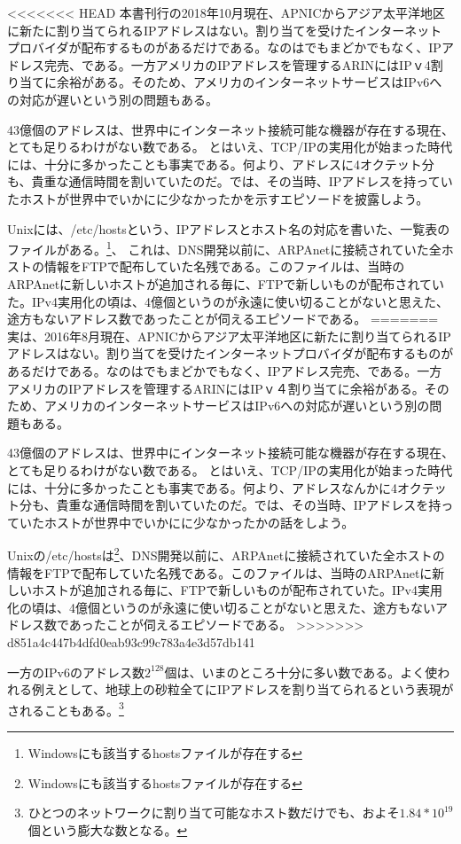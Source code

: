 \begin{itemize}
<<<<<<< HEAD
本書刊行の2018年10月現在、APNICからアジア太平洋地区に新たに割り当てられるIPアドレスはない。割り当てを受けたインターネットプロバイダが配布するものがあるだけである。なのはでもまどかでもなく、IPアドレス完売、である。一方アメリカのIPアドレスを管理するARINにはIPｖ4割り当てに余裕がある。そのため、アメリカのインターネットサービスはIPv6への対応が遅いという別の問題もある。

43億個のアドレスは、世界中にインターネット接続可能な機器が存在する現在、とても足りるわけがない数である。
とはいえ、TCP/IPの実用化が始まった時代には、十分に多かったことも事実である。何より、アドレスに4オクテット分も、貴重な通信時間を割いていたのだ。では、その当時、IPアドレスを持っていたホストが世界中でいかにに少なかったかを示すエピソードを披露しよう。

Unixには、/etc/hostsという、IPアドレスとホスト名の対応を書いた、一覧表のファイルがある。\footnote{Windowsにも該当するhostsファイルが存在する}、
これは、DNS開発以前に、ARPAnetに接続されていた全ホストの情報をFTPで配布していた名残である。このファイルは、当時のARPAnetに新しいホストが追加される毎に、FTPで新しいものが配布されていた。IPv4実用化の頃は、4億個というのが永遠に使い切ることがないと思えた、途方もないアドレス数であったことが伺えるエピソードである。
=======
実は、2016年8月現在、APNICからアジア太平洋地区に新たに割り当てられるIPアドレスはない。割り当てを受けたインターネットプロバイダが配布するものがあるだけである。なのはでもまどかでもなく、IPアドレス完売、である。一方アメリカのIPアドレスを管理するARINにはIPｖ４割り当てに余裕がある。そのため、アメリカのインターネットサービスはIPv6への対応が遅いという別の問題もある。

43億個のアドレスは、世界中にインターネット接続可能な機器が存在する現在、とても足りるわけがない数である。
とはいえ、TCP/IPの実用化が始まった時代には、十分に多かったことも事実である。何より、アドレスなんかに4オクテット分も、貴重な通信時間を割いていたのだ。では、その当時、IPアドレスを持っていたホストが世界中でいかにに少なかったかの話をしよう。

Unixの/etc/hostsは\footnote{Windowsにも該当するhostsファイルが存在する}、DNS開発以前に、ARPAnetに接続されていた全ホストの情報をFTPで配布していた名残である。このファイルは、当時のARPAnetに新しいホストが追加される毎に、FTPで新しいものが配布されていた。IPv4実用化の頃は、4億個というのが永遠に使い切ることがないと思えた、途方もないアドレス数であったことが伺えるエピソードである。
>>>>>>> d851a4c447b4dfd0eab93c99c783a4e3d57db141

一方のIPv6のアドレス数$2^{128}$個は、いまのところ十分に多い数である。よく使われる例えとして、地球上の砂粒全てにIPアドレスを割り当てられるという表現がされることもある。\footnote{ひとつのネットワークに割り当て可能なホスト数だけでも、およそ$1.84*10^{19}$個という膨大な数となる。}


\end{itemize}
